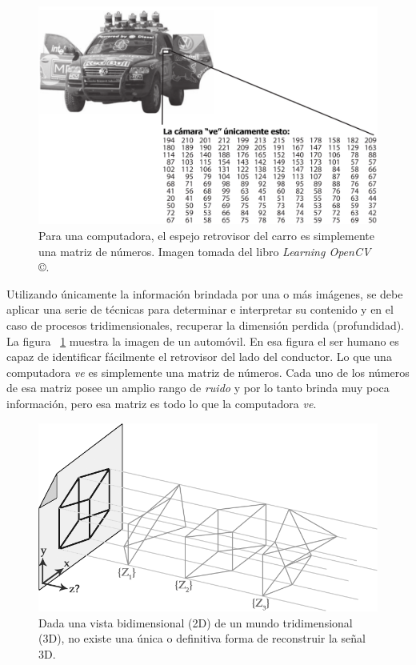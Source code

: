 \begin{figure}[H]
\centering
\includegraphics[width=1.0\textwidth]{images/fig1.png}
\caption[Lo que las computadoras ven en \emph{Visi\'{o}n Artificial}]%
{Para una computadora, el espejo retrovisor del carro es simplemente una matriz de n\'{u}meros. Imagen tomada del libro \emph{Learning OpenCV} \copyright \cite{Bradski_Kaehler_2008}.}
\label{fig:WhatComputersSee}
\end{figure}

Utilizando \'{u}nicamente la informaci\'{o}n brindada por una o m\'{a}s im\'{a}genes, se debe aplicar una serie de t\'{e}cnicas para determinar e interpretar su contenido y en el caso de procesos tridimensionales, recuperar la dimensi\'{o}n perdida (profundidad). La figura ~\ref{fig:WhatComputersSee} muestra la imagen de un autom\'{o}vil. En esa figura el ser humano es capaz de identificar f\'{a}cilmente el retrovisor del lado del conductor. Lo que una computadora \emph{ve} es simplemente una matriz de n\'{u}meros. Cada uno de los n\'{u}meros de esa matriz posee un amplio rango de \emph{ruido} y por lo tanto brinda muy poca informaci\'{o}n, pero esa matriz es todo lo que la computadora \emph{ve}.

\begin{figure}[H]
\centering
\includegraphics[width=1.0\textwidth]{images/2dto3dambiguity.png}
\caption[Problema de ambiguedad de una vista bidimensional (2D) de un mundo tridimensional (3D)]%
{Dada una vista bidimensional (2D) de un mundo tridimensional (3D), no existe una \'{u}nica o definitiva forma de reconstruir la señal 3D.}
\label{fig:2Dto3Dambiguity}
\end{figure}

